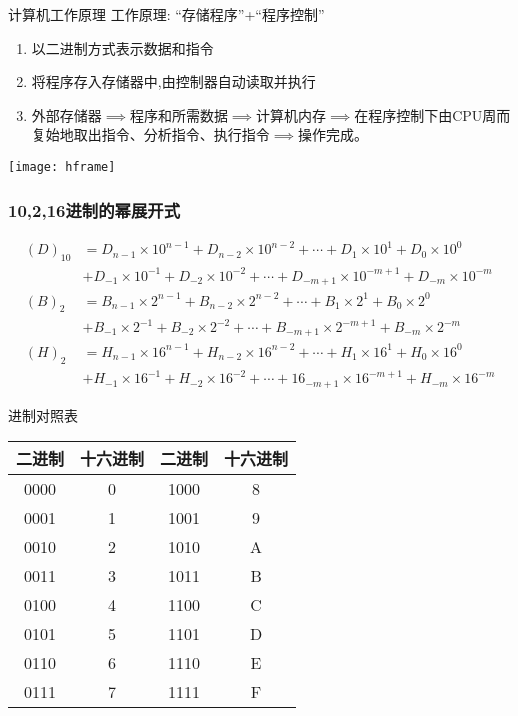 \begin{frame}{计算机工作原理}
工作原理: ``存储程序''+``程序控制''
\begin{enumerate}
	\item 以二进制方式表示数据和指令
	\item 将程序存入存储器中,由控制器自动读取并执行
	\item 外部存储器$\implies$程序和所需数据$\implies$计算机内存$\implies$在程序控制下由CPU周而复始地取出指令、分析指令、执行指令$\implies$操作完成。	
\end{enumerate}
\texttt{[image: hframe]}
\end{frame}

\begin{frame}[shrink]
\frametitle{10,2,16进制的幂展开式}
\begin{align*}
(D)_{10}&=D_{n-1}\times 10^{n-1}+D_{n-2}\times 10^{n-2}+\cdots+D_{1}\times 10^{1}+D_{0}\times 10^{0}\\
&+D_{-1}\times 10^{-1}+D_{-2}\times 10^{-2}+\cdots+D_{-m+1}\times 10^{-m+1}+D_{-m}\times 10^{-m}\\
(B)_{2}&=B_{n-1}\times 2^{n-1}+B_{n-2}\times 2^{n-2}+\cdots+B_{1}\times 2^{1}+B_{0}\times 2^{0}\\
&+B_{-1}\times 2^{-1}+B_{-2}\times 2^{-2}+\cdots+B_{-m+1}\times 2^{-m+1}+B_{-m}\times 2^{-m}\\
(H)_{2}&=H_{n-1}\times 16^{n-1}+H_{n-2}\times 16^{n-2}+\cdots+H_{1}\times 16^{1}+H_{0}\times 16^{0}\\
&+H_{-1}\times 16^{-1}+H_{-2}\times 16^{-2}+\cdots+16_{-m+1}\times 16^{-m+1}+H_{-m}\times 16^{-m}
\end{align*}
\end{frame}

\begin{frame}{进制对照表}
\begin{tabular}{|c|c||c|c|}
	\hline 
	二进制 & 十六进制 & 二进制 & 十六进制 \\ 
	\hline 
	0000 &  0 & 1000  & 8 \\ 
	\hline 
	0001 &  1 & 1001  & 9 \\ 
	\hline 
	0010 &  2 & 1010  & A \\ 
	\hline 
	0011 &  3 & 1011  & B \\ 
	\hline 
	0100 &  4 & 1100  & C \\ 
	\hline 
	0101 &  5 & 1101  & D \\ 
	\hline 
	0110 &  6 & 1110  & E \\ 
	\hline 
	0111 &  7 & 1111  & F \\ 
	\hline 
\end{tabular} 
\end{frame}

